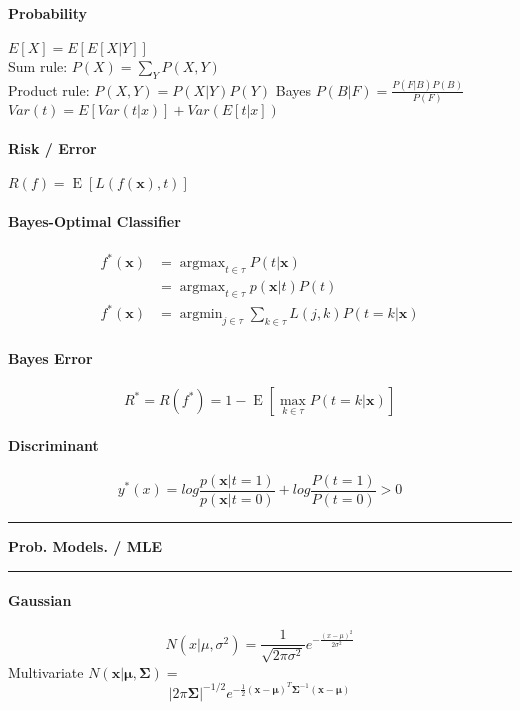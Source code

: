 \documentclass[7pt]{scrartcl}
\newlength{\secskip}
\renewcommand{\section}[1]{
  \vspace{\secskip}
  \hrule\vspace{.3em}
  \textbf{#1}
  \vspace{.3em}
  \hrule
  \vspace{\secskip}
}
\DeclareMathOperator*{\argmax}{argmax}
\DeclareMathOperator*{\argmin}{argmin}
\DeclareMathOperator{\E}{E}
\renewcommand{\vec}{\mathbf}
\begin{document}
\begin{multicols}{4}
\paragraph{Probability}
$E[X] = E[E[X|Y]]$ \\
Sum rule: $P(X) = \sum_Y P(X,Y)$\\
Product rule: $P(X,Y) = P(X|Y)P(Y)$
Bayes $P(B|F) = \frac{P(F|B)P(B)}{P(F)}$ \\
$Var(t) = E[Var(t|x)] + Var(E[t|x])$
\paragraph{Risk / Error}
$ R(f) = \E \left [ L(f(\vec x), t) \right ]$

\paragraph{Bayes-Optimal Classifier}
\begin{align*}
f^*(\vec x) &= \argmax_{t \in \tau} P(t|\vec x) \\ 
&= \argmax_{t \in \tau} p(\vec x|t) P(t) \\
f^*(\vec x) &= \argmin_{j \in \tau} \sum_{k \in \tau} L(j,k) P(t = k | \vec x) \end{align*}

\paragraph{Bayes Error}
\[ R^* = R(f^*) = 1 - \E \left [ \max_{k\in\tau} P(t = k | \vec x) \right ] \]


\paragraph{Discriminant}
\[y^*(x) = log \frac{p(\vec{x}|t=1)}{p(\vec{x}|t=0)} + log \frac{P(t=1)}{P(t=0)} > 0\]
\section{Prob. Models. / MLE}

\paragraph{Gaussian}
\[N(x|\mu,\sigma^2) = \frac{1}{\sqrt{2\pi\sigma^2}} e^{-\frac{(x-\mu)^2}{2\sigma^2}}\]
Multivariate $N(\vec{x}|\vec{\mu},\vec{\Sigma}) =$
\[|2\pi\vec{\Sigma}|^{-1/2} e^{-\frac{1}{2}(\vec{x}-\vec{\mu})^T\vec{\Sigma}^{-1}(\vec{x}-\vec{\mu})}\]


\end{multicols}
\end{document}

